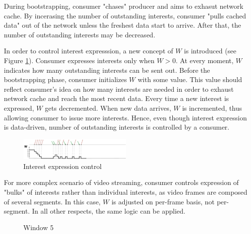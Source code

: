 \documentclass[10pt]{proc}
\begin{document}
During bootstrapping, consumer "chases" producer and aims to exhasut network cache. By incerasing the number of outstanding interests, consumer "pulls cached data" out of the network unless the freshest data start to arrive. After that, the number of outstanding interests may be decreased. 

In order to control interest expresssion, a new concept of $W$ is introduced (see Figure \ref{fig:w-concept}). Consumer expresses interests only when $W > 0$. At every moment, $W$ indicates how many outstanding interests can be sent out. Before the bootstrapping phase, consumer initializes $W$ with some value. This value should reflect consumer's idea on how many interests are needed in order to exhaust network cache and reach the most recent data. Every time a new interest is expressed, $W$ gets decremented. When new data arrives, $W$ is incremented, thus allowing consumer to issue more interests. Hence, even though interest expression is data-driven, number of outstanding interests is controlled by a consumer.

\begin{figure}[Ht!]
\centering
\includegraphics[width=0.5\textwidth]{w-concept}
\caption{Interest expression control}
\label{fig:w-concept}
\end{figure}

For more complex scenario of video streaming, consumer controls expression of "bulks" of interests rather than individual interests, as video frames are composed of several segments. In this case, $W$ is adjusted on per-frame basis, not per-segment. In all other respects, the same logic can be applied.


\begin{figure}[Ht!]
\centering
\begin{tiny}
\end{tiny}

\caption{Window 5}
\label{fig:w5}
\end{figure}

\end{document}
